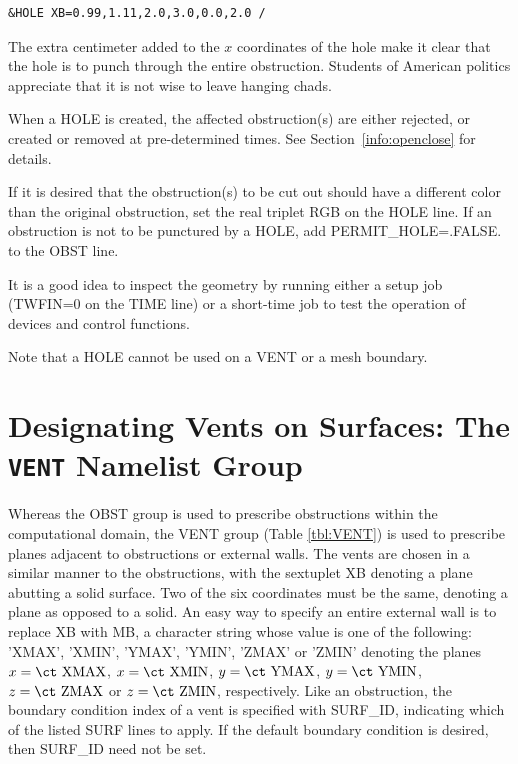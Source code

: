 \documentclass[11pt]{book}
\begin{document}
\footnotesize
\begin{verbatim}
&HOLE XB=0.99,1.11,2.0,3.0,0.0,2.0 /
\end{verbatim}
\normalsize
The extra centimeter added to the $x$ coordinates of the hole make it clear
that the hole is to punch through the entire obstruction. Students of
American politics appreciate that it is not wise to leave hanging
chads.

When a {\ct HOLE} is created, the affected obstruction(s) are either rejected, or
created or removed at pre-determined times. See
Section~\ref{info:openclose} for details.

If it is desired that the obstruction(s) to be cut out should have a different color
than the original obstruction, set the real triplet {\ct RGB} on the {\ct HOLE} line.
If an obstruction is not to be punctured by a {\ct HOLE}, add
{\ct PERMIT\_HOLE=.FALSE.} to the {\ct OBST} line.

It is a good idea to inspect the geometry by running either a setup job
({\ct TWFIN=0} on the {\ct TIME} line) or a short-time job to test the operation of devices and control functions.

\begin{warning}
\noindent
Note that a {\ct HOLE} cannot be used on a {\ct VENT} or a mesh boundary.
\end{warning}



\section{Designating Vents on Surfaces: The \texorpdfstring{{\tt VENT}}{VENT} Namelist Group}%
\label{info:VENT}

Whereas the {\ct OBST} group is used to prescribe obstructions within the
computational domain, the {\ct VENT} group (Table \ref{tbl:VENT}) is used to prescribe planes
adjacent to obstructions or external walls. The vents are chosen in a
similar manner to the obstructions, with the sextuplet {\ct XB}
denoting a plane abutting a solid surface. Two of the six coordinates must
be the same, denoting a plane as opposed to a solid.
An easy way to specify an entire external wall is to replace {\ct XB} with
{\ct MB}, a character string whose value is one of the following:
{\ct 'XMAX'}, {\ct 'XMIN'}, {\ct 'YMAX'}, {\ct 'YMIN'}, {\ct 'ZMAX'} or
{\ct 'ZMIN'} denoting the planes $x=\hbox{\ct XMAX}$, $x=\hbox{\ct XMIN}$,
$y=\hbox{\ct YMAX}$, $y=\hbox{\ct YMIN}$, $z=\hbox{\ct ZMAX}$
or $z=\hbox{\ct ZMIN}$, respectively.
Like an obstruction, the boundary condition index of a vent is specified
with {\ct SURF\_ID}, indicating which of the listed {\ct SURF} lines to
apply. If the default boundary condition is desired, then {\ct SURF\_ID} need not be set.
\end{document}
